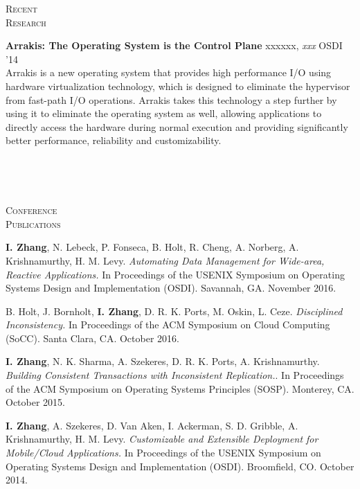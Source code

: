 \documentclass[10pt,times]{report}
\newlength{\sectiongap}
\newlength{\entrygap}
\newlength{\sectioncolwidth}
\newlength{\colgap}
\newlength{\stuffwidth}
\def\ifEqString#1#2{\def\testa{#1}\def\testb{#2}%
  \ifx\testa\testb}
\newenvironment{rtable}{
  \begin{minipage}{\textwidth}
  }{
  \end{minipage}
}
\newenvironment{rentry}[3][xxx]{
  \begin{minipage}[t]{\hsize}
    \textbf{#2}\ifEqString{#1}{xxx}\relax\else, \textit{#1}\fi
    \hspace{\stretch{1}} #3 \\
  }{
    \removelastskip
  \end{minipage}
  \\[\entrygap]  %
}
\newenvironment{rsection}[1]{
  \begin{minipage}[t]{\sectioncolwidth}
    \textsc{#1}
  \end{minipage}
  \hspace{\colgap}
  \begin{minipage}[t]{\stuffwidth}
  }{
    \removelastskip
  \end{minipage}
  \\[\sectiongap]
}
\begin{document}
\begin{rtable}
\begin{rsection}{Recent\\Research}
    \begin{rentry}{Arrakis: The Operating System is the Control
        Plane}{OSDI '14}
      Arrakis is a new operating system that provides high performance
      I/O using hardware virtualization technology, which is designed
      to eliminate the hypervisor from fast-path I/O
      operations. Arrakis takes this technology a step further by
      using it to eliminate the operating system as well, allowing
      applications to directly access the hardware during normal
      execution and providing significantly better performance,
      reliability and customizability.
    \end{rentry}
  \end{rsection}    
\end{rtable}

\begin{rtable}
 \begin{rsection}{Conference\\Publications}
   \textbf{I. Zhang}, N. Lebeck, P. Fonseca, B. Holt, R. Cheng,
   A. Norberg, A. Krishnamurthy, H.  M. Levy. \textit{Automating Data
     Management for Wide-area, Reactive Applications.}  In Proceedings
   of the USENIX Symposium on Operating Systems Design and
   Implementation (OSDI). Savannah, GA. November
   2016.\\\vspace{-0.5em}

   B. Holt, J. Bornholt, \textbf{I. Zhang}, D. R. K. Ports, M.  Oskin,
   L. Ceze. \textit{Disciplined Inconsistency.}  In Proceedings of the
   ACM Symposium on Cloud Computing (SoCC). Santa Clara, CA. October
   2016.\\\vspace{-0.5em}

   \textbf{I. Zhang}, N. K. Sharma, A. Szekeres, D. R. K. Ports,
   A. Krishnamurthy. \textit{Building Consistent Transactions with
     Inconsistent Replication.}.  In Proceedings of the ACM Symposium
   on Operating Systems Principles (SOSP). Monterey, CA. October
   2015.\\\vspace{-0.5em}

   \textbf{I. Zhang}, A. Szekeres, D. Van Aken, I. Ackerman,
   S. D. Gribble, A. Krishnamurthy, H. M. Levy. \textit{Customizable
     and Extensible Deployment for Mobile/Cloud Applications.}  In
   Proceedings of the USENIX Symposium on Operating Systems Design and
   Implementation (OSDI). Broomfield, CO. October 2014.\\
   \vspace{-0.5em}


\end{rsection}
\end{rtable}
\end{document}
